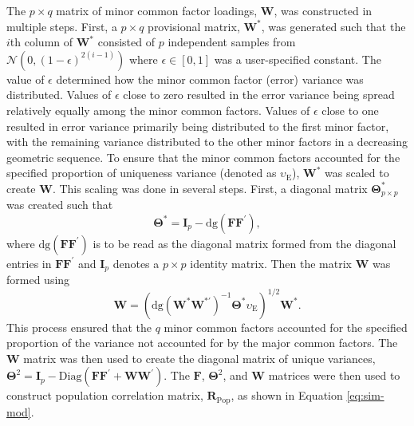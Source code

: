 \documentclass[
  english,
  man]{apa6}
\begin{document}
The \(p \times q\) matrix of minor common factor loadings, \(\mathbf{W}\), was constructed in multiple steps. First, a \(p \times q\) provisional matrix, \(\mathbf{W}^*\), was generated such that the \(i\)th column of \(\mathbf{W}^*\) consisted of \(p\) independent samples from \(\mathcal{N}(0, (1 - \epsilon)^{2(i-1)})\) where \(\epsilon \in [0,1]\) was a user-specified constant. The value of \(\epsilon\) determined how the minor common factor (error) variance was distributed. Values of \(\epsilon\) close to zero resulted in the error variance being spread relatively equally among the minor common factors. Values of \(\epsilon\) close to one resulted in error variance primarily being distributed to the first minor factor, with the remaining variance distributed to the other minor factors in a decreasing geometric sequence. To ensure that the minor common factors accounted for the specified proportion of uniqueness variance (denoted as \(\upsilon_{\textrm{E}}\)), \(\mathbf{W}^*\) was scaled to create \(\mathbf{W}\). This scaling was done in several steps. First, a diagonal matrix \(\mathbf{\Theta}^*_{p \times p}\) was created such that
\begin{equation}
\mathbf{\Theta}^* = \mathbf{I}_p - \textrm{dg}(\mathbf{F}\mathbf{F}^\prime),
\label{eq:theta-star}
\end{equation}
where \(\textrm{dg}(\mathbf{F}\mathbf{F}^\prime)\) is to be read as the diagonal matrix formed from the diagonal entries in \(\mathbf{F}\mathbf{F}^\prime\) and \(\mathbf{I}_p\) denotes a \(p \times p\) identity matrix. Then the matrix \(\mathbf{W}\) was formed using
\begin{equation}
\mathbf{W} = (\textrm{dg}(\mathbf{W}^* \mathbf{W}^{*\prime})^{-1} \mathbf{\Theta}^* \upsilon_\textrm{E})^{1/2} \mathbf{W}^*.
\label{eq:W-matrix}
\end{equation}
This process ensured that the \(q\) minor common factors accounted for the specified proportion of the variance not accounted for by the major common factors. The \(\mathbf{W}\) matrix was then used to create the diagonal matrix of unique variances, \(\mathbf{\Theta}^2 = \mathbf{I}_p - \textrm{Diag}(\mathbf{FF}^\prime + \mathbf{WW}^\prime)\). The \(\mathbf{F}\), \(\mathbf{\Theta}^2\), and \(\mathbf{W}\) matrices were then used to construct population correlation matrix, \(\mathbf{R}_{\textrm{Pop}}\), as shown in Equation \eqref{eq:sim-mod}.
\end{document}
